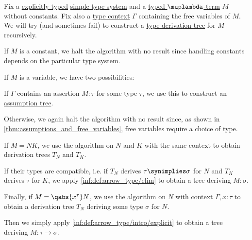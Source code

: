 \begin{algorithm}\label{alg:simply_typed_term_type_inference}
  Fix a \hyperref[def:simple_type_system_style]{explicitly typed} \hyperref[def:simple_type_system]{simple type system} and a \hyperref[def:typed_lambda_term]{typed \( \muplambda \)-term} \( M \) without constants. Fix also a \hyperref[def:type_context]{type context} \( \Gamma \) containing the free variables of \( M \). We will try (and sometimes fail) to construct a \hyperref[def:type_derivation_tree]{type derivation tree} for \( M \) recursively.

  \begin{thmenum}
     If \( M \) is a constant, we halt the algorithm with no result since handling constants depends on the particular type system.

     If \( M \) is a variable, we have two possibilities:
    \begin{thmenum}
       If \( \Gamma \) contains an assertion \( M: \tau \) for some type \( \tau \), we use this to construct an \hyperref[def:type_derivation_tree/assumption]{assumption tree}.

       Otherwise, we again halt the algorithm with no result since, as shown in \cref{thm:assumptions_and_free_variables}, free variables require a choice of type.
    \end{thmenum}

     If \( M = NK \), we use the algorithm on \( N \) and \( K \) with the same context to obtain derivation trees \( T_N \) and \( T_K \).

    If their types are compatible, i.e. if \( T_N \) derives \( \tau \synimplies \sigma \) for \( N \) and \( T_K \) derives \( \tau \) for \( K \), we apply \ref{inf:def:arrow_type/elim} to obtain a tree deriving \( M: \sigma \).

     Finally, if \( M = \qabs {x^\tau} N \), we use the algorithm on \( N \) with context \( \Gamma, x: \tau \) to obtain a derivation tree \( T_N \) deriving some type \( \sigma \) for \( N \).

    Then we simply apply \ref{inf:def:arrow_type/intro/explicit} to obtain a tree deriving \( M: \tau \to \sigma \).
  \end{thmenum}
\end{algorithm}
